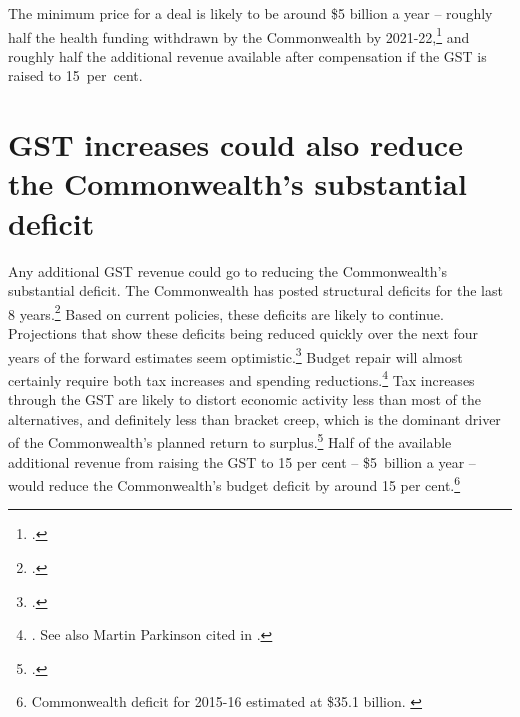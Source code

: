 \documentclass{grattanAlpha}
\begin{document}
The minimum price for a deal is likely to be around \$5 billion a year – roughly half the health funding withdrawn by the Commonwealth by 2021-22,\footcite[][18]{DaleyWood2015FiscalChallenges}  and roughly half the additional revenue available after compensation if the GST is raised to 15~per~cent.

\section{GST increases could also reduce the Commonwealth's substantial deficit}\label{sec:GST-4-2}
Any additional GST revenue could go to reducing the Commonwealth’s substantial deficit. The Commonwealth has posted structural deficits for the last 8 years.\footcite[][4]{DaleyWood2015FiscalChallenges}  Based on current policies, these deficits are likely to continue. Projections that show these deficits being reduced quickly over the next four years of the forward estimates seem optimistic.\footcite[][8--14]{DaleyWood2015FiscalChallenges}  Budget repair will almost certainly require both tax increases and spending reductions.\footnote{\textcite[][4]{DaleyWood2015FiscalChallenges}. See also Martin Parkinson cited in \textcite{Uren2015-Parkinson-tackle-spending-revenue}.}  Tax increases through the GST are likely to distort economic activity less than most of the alternatives, and definitely less than bracket creep, which is the dominant driver of the Commonwealth’s planned return to surplus.\footcite[][5--6]{DaleyWood2015FiscalChallenges}  Half of the available additional revenue from raising the GST to 15 per cent – \$5~billion a year  – would reduce the Commonwealth’s budget deficit by around 15 per cent.\footnote{Commonwealth deficit for 2015-16 estimated at \$35.1 billion. \textcite{Treasury2015FinalBudgetOutcome1415} } 
\end{document}
